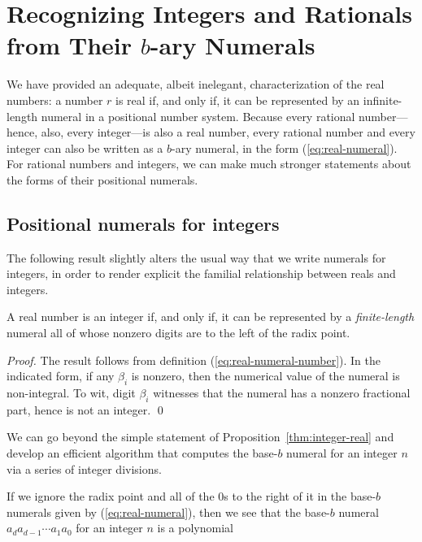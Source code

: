 
\section{Recognizing Integers and  Rationals from Their $b$-ary Numerals}
\label{sec:special-numerals-N-Q}

We have provided an adequate, albeit inelegant, characterization of
the real numbers: a number $r$ is real if, and only if, it can be
represented by an infinite-length numeral in a positional number
system.  Because every rational number---hence, also, every
integer---is also a real number, every rational number and every
integer can also be written as a $b$-ary numeral, in the form
(\ref{eq:real-numeral}).  For rational numbers and integers, we can
make much stronger statements about the forms of their positional
numerals.


\subsection{Positional numerals for integers}
\label{sec:special-numerals-N}

The following result slightly alters the usual way that we write
numerals for integers, in order to render explicit the familial
relationship between reals and integers.

\begin{prop}
\label{thm:integer-real}
A real number is an integer if, and only if, it can be represented by
a {\em finite-length} numeral all of whose nonzero digits are to the
left of the radix point.
\end{prop}

\begin{proof}
The result follows from definition (\ref{eq:real-numeral-number}).  In
the indicated form, if any $\beta_i$ is nonzero, then the numerical
value of the numeral is non-integral.  To wit, digit $\beta_i$
witnesses that the numeral has a nonzero fractional part, hence is not
an integer.  \qed
\end{proof}

We can go beyond the simple statement of
Proposition~\ref{thm:integer-real} and develop an efficient algorithm
that computes the base-$b$ numeral for an integer $n$ via a series of
integer divisions.

\bigskip

%
If we ignore the radix point and all of the $0$s to the right of it in
the base-$b$ numerals given by (\ref{eq:real-numeral}), then we see
that the base-$b$ numeral $a_d a_{d-1} \cdots a_1 a_0$ for an integer
$n$ is a polynomial

